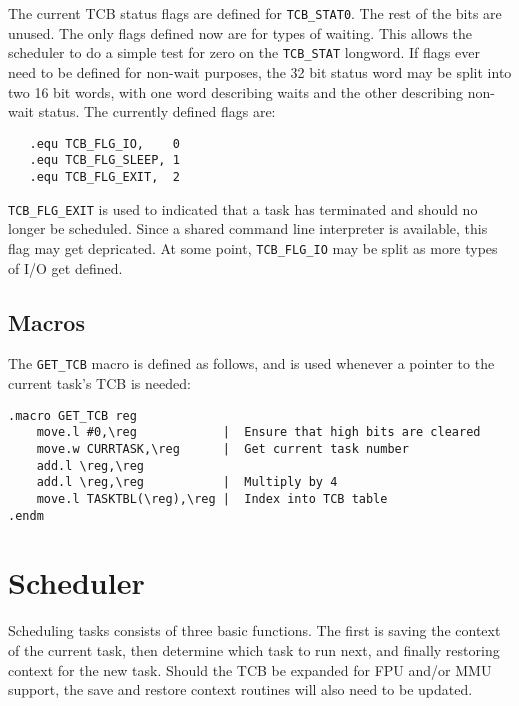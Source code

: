 \documentclass[10pt, openany]{book}
\begin{document}
The current TCB status flags are defined for \verb|TCB_STAT0|.  The rest of the bits are unused.  The only flags defined now are for types of waiting.  This allows the scheduler to do a simple test for zero on the \verb|TCB_STAT| longword.  If flags ever need to be defined for non-wait purposes, the 32 bit status word may be split into two 16 bit words, with one word describing waits and the other describing non-wait status.  The currently defined flags are:
\begin{lstlisting}
   .equ TCB_FLG_IO,    0
   .equ TCB_FLG_SLEEP, 1
   .equ TCB_FLG_EXIT,  2
\end{lstlisting}
\verb|TCB_FLG_EXIT| is used to indicated that a task has terminated and should no longer be scheduled.  Since a shared command line interpreter is available, this flag may get depricated.  At some point, \verb|TCB_FLG_IO| may be split as more types of I/O get defined.

\subsection{Macros}

The \verb|GET_TCB| macro is defined as follows, and is used whenever a pointer to the current task's TCB is needed:
\begin{lstlisting}
.macro GET_TCB reg
    move.l #0,\reg            |  Ensure that high bits are cleared
    move.w CURRTASK,\reg      |  Get current task number
    add.l \reg,\reg
    add.l \reg,\reg           |  Multiply by 4
    move.l TASKTBL(\reg),\reg |  Index into TCB table
.endm
\end{lstlisting}

\section{Scheduler}
Scheduling tasks consists of three basic functions.  The first is saving the context of the current task, then determine which task to run next, and finally restoring context for the new task.  Should the TCB be expanded for FPU and/or MMU support, the save and restore context routines will also need to be updated.
\end{document}
